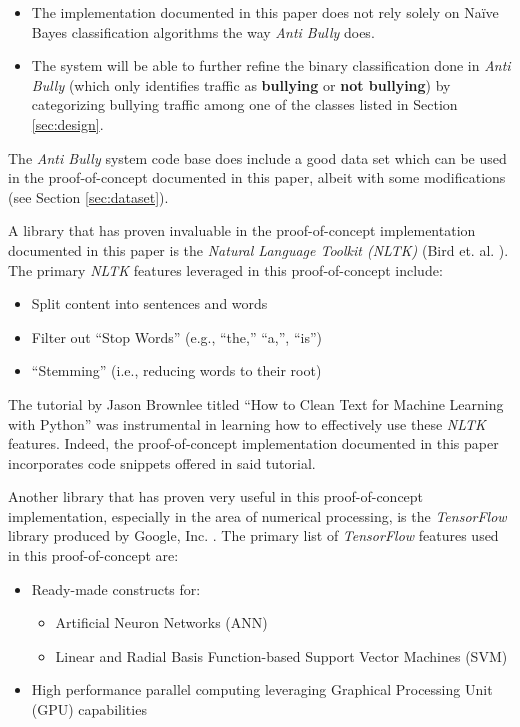 \documentclass[conference]{sig-alternate-05-2015}
\begin{document}
\begin{itemize}
  \item The implementation documented in this paper does not rely solely on
  Na\"{i}ve Bayes classification algorithms the way \textit{Anti Bully} does.
  \item The system will be able to further refine the binary
  classification done in \textit{Anti Bully} (which only identifies traffic as
  \textbf{bullying} or \textbf{not bullying}) by categorizing bullying traffic
  among one of the classes listed in Section \ref{sec:design}.
\end{itemize}

The \textit{Anti Bully} system code base does include a good data set which can
be used in the proof-of-concept documented in this paper, albeit with some
modifications (see Section \ref{sec:dataset}).

A library that has proven invaluable in the proof-of-concept implementation
documented in this paper is the \textit{Natural Language Toolkit (NLTK)}
(Bird et. al. \cite{bird2009natural}). The primary \textit{NLTK} features
leveraged in this proof-of-concept include:
\begin{itemize}
  \item Split content into sentences and words
  \item Filter out ``Stop Words'' (e.g., ``the,'' ``a,'', ``is'')
  \item ``Stemming'' (i.e., reducing words to their root)
\end{itemize}

The tutorial by Jason Brownlee titled ``How to Clean Text for Machine Learning
with Python'' \cite{brownlee-2017} was instrumental in learning how to
effectively use these \textit{NLTK} features. Indeed, the proof-of-concept
implementation documented in this paper incorporates code snippets offered in
said tutorial.

Another library that has proven very useful in this proof-of-concept
implementation, especially in the area of numerical processing, is the
\textit{TensorFlow} library produced by Google, Inc.
\cite{tensorflow2015-whitepaper}. The primary list of \textit{TensorFlow}
features used in this proof-of-concept are:
\begin{itemize}
  \item Ready-made constructs for:
  \begin{itemize}
    \item Artificial Neuron Networks (ANN)
    \item Linear and Radial Basis Function-based Support Vector Machines (SVM)
  \end{itemize}
  \item High performance parallel computing leveraging Graphical Processing
  Unit (GPU) capabilities
\end{itemize}
\end{document}
